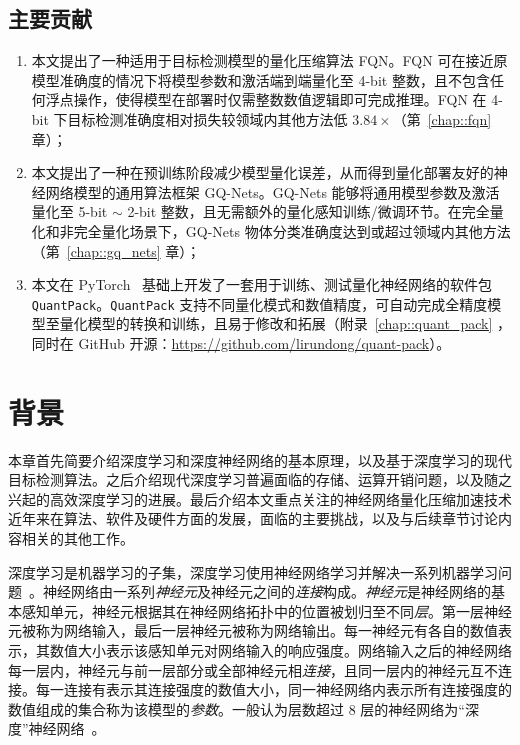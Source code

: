 \documentclass[
]{shtthesis}
\begin{document}
\section{主要贡献}
\begin{enumerate}
  \item 本文提出了一种适用于目标检测模型的量化压缩算法 FQN。FQN 可在接近原模型准确度的情况下将模型参数和激活端到端量化至 4-bit 整数，且不包含任何浮点操作，使得模型在部署时仅需整数数值逻辑即可完成推理。FQN 在 4-bit 下目标检测准确度相对损失较领域内其他方法低 $3.84\times$（第~\ref{chap::fqn} 章）；
  \item 本文提出了一种在预训练阶段减少模型量化误差，从而得到量化部署友好的神经网络模型的通用算法框架 GQ-Nets。GQ-Nets 能够将通用模型参数及激活量化至 5-bit $\sim$ 2-bit 整数，且无需额外的量化感知训练/微调环节。在完全量化和非完全量化场景下，GQ-Nets 物体分类准确度达到或超过领域内其他方法（第~\ref{chap::gq_nets} 章）；
  \item 本文在 PyTorch~\citep{paszke2019pytorch} 基础上开发了一套用于训练、测试量化神经网络的软件包 \verb|QuantPack|。\verb|QuantPack| 支持不同量化模式和数值精度，可自动完成全精度模型至量化模型的转换和训练，且易于修改和拓展（附录~\ref{chap::quant_pack} ，同时在 GitHub 开源：\url{https://github.com/lirundong/quant-pack}）。
\end{enumerate}
\chapter{背景} \label{chap::background}
本章首先简要介绍深度学习和深度神经网络的基本原理，以及基于深度学习的现代目标检测算法。之后介绍现代深度学习普遍面临的存储、运算开销问题，以及随之兴起的高效深度学习的进展。最后介绍本文重点关注的神经网络量化压缩加速技术近年来在算法、软件及硬件方面的发展，面临的主要挑战，以及与后续章节讨论内容相关的其他工作。

深度学习是机器学习的子集，深度学习使用神经网络学习并解决一系列机器学习问题~\citep{lecun2015deep}。神经网络由一系列\emph{神经元}及神经元之间的\emph{连接}构成。\emph{神经元}是神经网络的基本感知单元，神经元根据其在神经网络拓扑中的位置被划归至不同\emph{层}。第一层神经元被称为网络输入，最后一层神经元被称为网络输出。每一神经元有各自的数值表示，其数值大小表示该感知单元对网络输入的响应强度。网络输入之后的神经网络每一层内，神经元与前一层部分或全部神经元相\emph{连接}，且同一层内的神经元互不连接。每一连接有表示其连接强度的数值大小，同一神经网络内表示所有连接强度的数值组成的集合称为该模型的\emph{参数}。一般认为层数超过 8 层的神经网络为“深度”神经网络~\citep{krizhevsky2012imagenet}。
\end{document}
